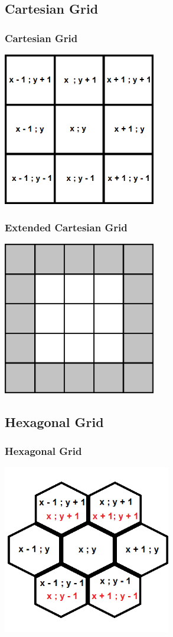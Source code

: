 \documentclass{beamer}
\begin{document}
\subsection{Cartesian Grid} 
\begin{frame}
\frametitle{Cartesian Grid}
\centering
\includegraphics[width=0.5\textwidth]{imgs/cartesian.png}
\end{frame}

\begin{frame}
\frametitle{Extended Cartesian Grid}
\centering
\includegraphics[width=0.5\textwidth]{imgs/extendedcartesian.png}
\end{frame}

\subsection{Hexagonal Grid} 
\begin{frame}
\frametitle{Hexagonal Grid}
\centering
\includegraphics[width=0.55\textwidth]{imgs/hexagonal.png}
\end{frame}
\end{document}
